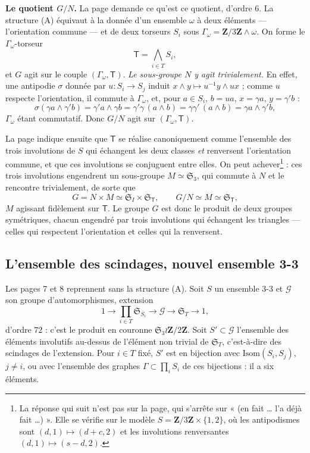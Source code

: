 \documentclass[11pt,a4paper]{article}
\begin{document}
\textbf{Le quotient $G/N$.} La page demande ce qu'est ce quotient, d'ordre $6$.
La structure (A) équivaut à la donnée d'un ensemble $\omega$ à deux éléments —
l'orientation commune — et de deux torseurs $S_i$ sous $\Gamma_\omega =
\mathbf{Z}/3\mathbf{Z} \wedge \omega$. On forme le $\Gamma_\omega$-torseur
\[
\mathsf{T} = \bigwedge_{i \in T} S_i ,
\]
et $G$ agit sur le couple $(\Gamma_\omega, \mathsf{T})$. \emph{Le sous-groupe $N$ y agit
trivialement.} En effet, une antipodie $\sigma$ donnée par $u : S_i \to S_j$ induit
$x \wedge y \mapsto u^{-1}y \wedge ux$ ; comme $u$ respecte l'orientation, il commute
à $\Gamma_\omega$, et, pour $a \in S_i$, $b = ua$, $x = \gamma a$, $y = \gamma' b$ :
\[
\sigma(\gamma a \wedge \gamma' b) = \gamma' a \wedge \gamma b = \gamma'\gamma\,(a \wedge b)
= \gamma\gamma'\,(a \wedge b) = \gamma a \wedge \gamma' b ,
\]
$\Gamma_\omega$ étant commutatif. Donc $G/N$ agit sur $(\Gamma_\omega, \mathsf{T})$.

La page indique ensuite que $\mathsf{T}$ se réalise canoniquement comme l'ensemble des
trois involutions de $S$ qui échangent les deux classes \emph{et} renversent
l'orientation commune, et que ces involutions se conjuguent entre elles. On peut
achever\footnote{La réponse qui suit n'est pas sur la page, qui s'arrête sur
« (en fait … l'a déjà fait …) ». Elle se vérifie sur le modèle
$S = \mathbf{Z}/3\mathbf{Z} \times \{1, 2\}$, où les antipodismes sont
$(d, 1) \mapsto (d + c, 2)$ et les involutions renversantes $(d, 1) \mapsto (s - d, 2)$.} :
ces trois involutions engendrent un sous-groupe $M \simeq \mathfrak{S}_3$, qui commute à
$N$ et le rencontre trivialement, de sorte que
\[
G = N \times M \simeq \mathfrak{S}_I \times \mathfrak{S}_{\mathsf{T}}, \qquad G/N \simeq M \simeq \mathfrak{S}_{\mathsf{T}} ,
\]
$M$ agissant fidèlement sur $\mathsf{T}$. Le groupe $G$ est donc le produit de deux
groupes symétriques, chacun engendré par trois involutions qui échangent les
triangles — celles qui respectent l'orientation et celles qui la renversent.

\subsection*{L'ensemble des scindages, nouvel ensemble 3-3}

Les pages 7 et 8 reprennent sans la structure (A). Soit $S$ un ensemble 3-3 et
$\mathcal{G}$ son groupe d'automorphismes, extension
\[
1 \to \prod_{i \in T} \mathfrak{S}_{S_i} \to \mathcal{G} \to \mathfrak{S}_T \to 1 ,
\]
d'ordre $72$ : c'est le produit en couronne $\mathfrak{S}_3 \wr \mathbf{Z}/2\mathbf{Z}$. Soit
$S' \subset \mathcal{G}$ l'ensemble des éléments involutifs au-dessus de l'élément non
trivial de $\mathfrak{S}_T$, c'est-à-dire des scindages de l'extension. Pour $i \in T$
fixé, $S'$ est en bijection avec $\mathrm{Isom}(S_i, S_j)$, $j \neq i$, ou avec
l'ensemble des graphes $\Gamma \subset \prod_i S_i$ de ces bijections : il a six
éléments.
\end{document}
